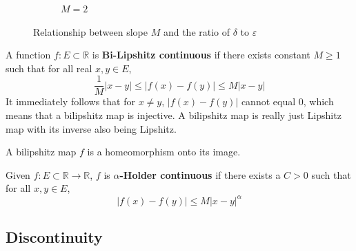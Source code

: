\begin{figure}[H]
\begin{subfigure}[b]{0.32\textwidth}
      \caption{$M = 2$}
    \end{subfigure}
    \caption{Relationship between slope $M$ and the ratio of $\delta$ to $\varepsilon$}
    \label{fig:slope-epsilon-delta}
  \end{figure}

  \begin{definition}
    A function $f: E \subset \mathbb{R}$ is \textbf{Bi-Lipshitz continuous} if there exists constant $M\geq 1$ such that for all real $x, y \in E$, 
    \[ \frac{1}{M} |x - y| \leq |f(x) - f(y)| \leq M |x - y|\]
    It immediately follows that for $x \neq y$, $ |f(x) - f(y)|$ cannot equal $0$, which means that a bilipshitz map is injective. A bilipshitz map is really just Lipshitz map with its inverse also being Lipshitz. 
  \end{definition}

  \begin{theorem}
    A bilipshitz map $f$ is a homeomorphism onto its image. 
  \end{theorem}

  \begin{definition}
    Given $f: E \subset \mathbb{R} \to \mathbb{R}$, $f$ is \textbf{$\alpha$-Holder continuous} if there exists a $C > 0$ such that for all $x, y \in E$, 
    \begin{equation}
      |f(x) - f(y)| \leq M |x - y|^\alpha
    \end{equation}
  \end{definition}

\subsection{Discontinuity}

